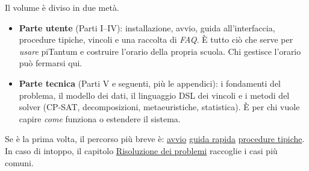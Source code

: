 \begin{schemabox}[title={Come leggere questo manuale}]
Il volume \`e diviso in due met\`a.
\begin{itemize}\setlength\itemsep{2pt}
  \item \textbf{Parte utente} (Parti I--IV): installazione, avvio,
        guida all'interfaccia, procedure tipiche, vincoli e una
        raccolta di \emph{FAQ}. \`E tutto ci\`o che serve per
        \emph{usare} piTantum e costruire l'orario della propria
        scuola. Chi gestisce l'orario pu\`o fermarsi qui.
  \item \textbf{Parte tecnica} (Parti V e seguenti, pi\`u le
        appendici): i fondamenti del problema, il modello dei
        dati, il linguaggio DSL dei vincoli e i metodi del solver
        (CP-SAT, decomposizioni, metaeuristiche, statistica). \`E
        per chi vuole capire \emph{come} funziona o estendere il
        sistema.
\end{itemize}
Se \`e la prima volta, il percorso pi\`u breve \`e:
\hyperref[ch:launcher]{avvio} \textrightarrow{}
\hyperref[ch:getting_started]{guida rapida} \textrightarrow{}
\hyperref[ch:workflow_tipici]{procedure tipiche}. In caso di
intoppo, il capitolo \hyperref[ch:faq]{Risoluzione dei problemi}
raccoglie i casi pi\`u comuni.
\end{schemabox}
